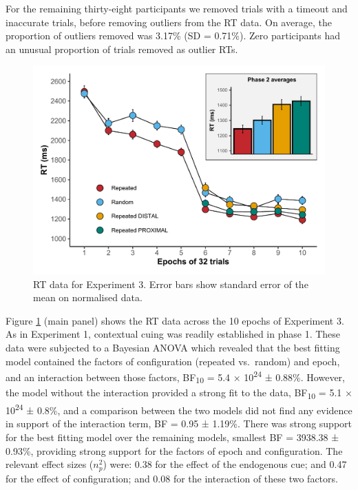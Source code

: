 \documentclass[
  man,floatsintext]{apa7}
\begin{document}
For the remaining thirty-eight participants we removed trials with a timeout and inaccurate trials, before removing outliers from the RT data. On average, the proportion of outliers removed was 3.17\% (SD = 0.71\%). Zero participants had an unusual proportion of trials removed as outlier RTs.

\begin{figure}

{\centering \includegraphics{CCC_ms1_files/figure-latex/Exp3-RT-figure-1} 

}

\caption{RT data for Experiment 3. Error bars show standard error of the mean on normalised data.}\label{fig:Exp3-RT-figure}
\end{figure}



Figure \ref{fig:Exp3-RT-figure} (main panel) shows the RT data across the 10 epochs of Experiment 3. As in Experiment 1, contextual cuing was readily established in phase 1. These data were subjected to a Bayesian ANOVA which revealed that the best fitting model contained the factors of configuration (repeated vs.~random) and epoch, and an interaction between those factors, BF\textsubscript{10} = 5.4 × 10\textsuperscript{24} ± 0.88\%. However, the model without the interaction provided a strong fit to the data, BF\textsubscript{10} = 5.1 × 10\textsuperscript{24} ± 0.8\%, and a comparison between the two models did not find any evidence in support of the interaction term, BF = 0.95 ± 1.19\%. There was strong support for the best fitting model over the remaining models, smallest BF = 3938.38 ± 0.93\%, providing strong support for the factors of epoch and configuration. The relevant effect sizes (\(n^2_p\)) were: 0.38 for the effect of the endogenous cue; and 0.47 for the effect of configuration; and 0.08 for the interaction of these two factors.
\end{document}
